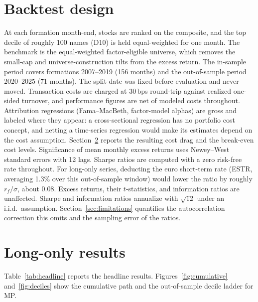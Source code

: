 \documentclass[11pt,a4paper]{article}
\begin{document}
\section{Backtest design}
\label{sec:backtest}

At each formation month-end, stocks are ranked on the composite, and the
top decile of roughly 100 names (D10) is held equal-weighted for one
month. The benchmark is the equal-weighted factor-eligible universe, which
removes the small-cap and universe-construction tilts from the excess return.
The in-sample period covers formations 2007--2019 (156 months) and the
out-of-sample period 2020--2025 (71 months). The split date was fixed before
evaluation and never moved. Transaction costs are charged at 30\,bps
round-trip against realized one-sided turnover, and performance figures
are net of modeled costs throughout. Attribution regressions
(Fama--MacBeth, factor-model alphas) are gross and labeled where they
appear: a cross-sectional regression has no portfolio cost concept, and
netting a time-series regression would make its estimates depend on the
cost assumption. Section~\ref{sec:results} reports the
resulting cost drag and the break-even cost levels. Significance of mean
monthly excess returns uses Newey--West standard
errors with 12 lags. Sharpe ratios are computed with a zero risk-free rate
throughout. For long-only series, deducting the euro short-term rate (ESTR,
averaging 1.3\% over this out-of-sample window) would lower the ratio by
roughly $r_f/\sigma$, about 0.08. Excess returns, their
$t$-statistics, and information ratios are unaffected. Sharpe and
information ratios annualize with $\sqrt{12}$ under an i.i.d.\ assumption.
Section~\ref{sec:limitations} quantifies the autocorrelation correction
this omits and the sampling error of the ratios.

\section{Long-only results}
\label{sec:results}

Table~\ref{tab:headline} reports the headline results.
Figures~\ref{fig:cumulative} and~\ref{fig:deciles} show the cumulative path
and the out-of-sample decile ladder for MP.
\end{document}
